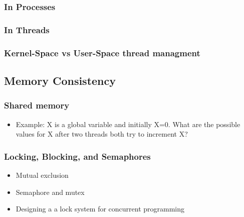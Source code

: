 \documentclass[11pt]{article}
\begin{document}
\subsubsection{In Processes}
\label{sec-6.3.1}

\subsubsection{In Threads}
\label{sec-6.3.2}

\subsubsection{Kernel-Space vs User-Space thread managment}
\label{sec-6.3.3}

\subsection{Memory Consistency}
\label{sec-6.4}

\subsubsection{Shared memory}
\label{sec-6.4.1}

\begin{itemize}

\item Example: X is a global variable and initially X=0. What are the possible values for X after two threads both try to increment X?\\
\label{sec-6.4.1.1}

\end{itemize} %
\subsubsection{Locking, Blocking, and Semaphores}
\label{sec-6.4.2}

\begin{itemize}

\item Mutual exclusion\\
\label{sec-6.4.2.1}


\item Semaphore and mutex\\
\label{sec-6.4.2.2}


\item Designing a a lock system for concurrent programming\\
\label{sec-6.4.2.3}

\end{itemize} %
\end{document}
